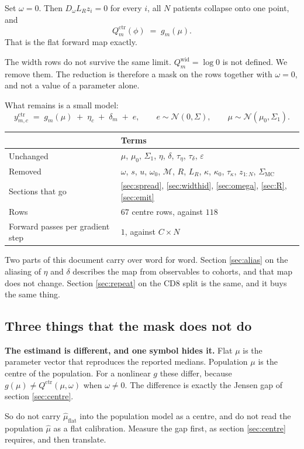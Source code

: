 \documentclass[11pt]{article}
\newcommand{\Ncal}{\mathcal{N}}
\newcommand{\Mset}{\mathcal{M}}
\newcommand{\ctr}{\mathrm{ctr}}
\newcommand{\wid}{\mathrm{wid}}
\begin{document}
Set $\omega=0$. Then $D_\omega L_R z_i = 0$ for every $i$, all $N$ patients
collapse onto one point, and
\begin{equation}
Q^\ctr_m(\phi) \;=\; g_m(\mu).
\end{equation}
That is the flat forward map exactly.

The width rows do not survive the same limit. $Q^\wid_m=\log 0$ is not defined.
We remove them. The reduction is therefore a mask on the rows together with
$\omega=0$, and not a value of a parameter alone.

What remains is a small model:
\begin{equation}
y^\ctr_{m,c} \;=\; g_m(\mu) \;+\; \eta_c \;+\; \delta_m \;+\; e,
\qquad e\sim\Ncal(0,\Sigma),
\qquad \mu\sim\Ncal(\mu_0,\Sigma_1).
\label{eq:flat}
\end{equation}

\begin{center}\small
\begin{tabularx}{\textwidth}{@{}lX@{}}
\toprule
 & Terms \\
\midrule
Unchanged & $\mu$, $\mu_0$, $\Sigma_1$, $\eta$, $\delta$, $\tau_\eta$,
             $\tau_\delta$, $\varepsilon$ \\
Removed & $\omega$, $s$, $u$, $\omega_0$, $\Mset$, $R$, $L_R$, $\kappa$,
          $\kappa_0$, $\tau_\kappa$, $z_{1:N}$, $\Sigma_{\text{MC}}$ \\
Sections that go & \ref{sec:spread}, \ref{sec:widthid}, \ref{sec:omega},
                   \ref{sec:R}, \ref{sec:emit} \\
Rows & $67$ centre rows, against $118$ \\
Forward passes per gradient step & $1$, against $C\times N$ \\
\bottomrule
\end{tabularx}
\end{center}

Two parts of this document carry over word for word. Section \ref{sec:alias} on
the aliasing of $\eta$ and $\delta$ describes the map from observables to
cohorts, and that map does not change. Section \ref{sec:repeat} on the CD8 split
is the same, and it buys the same thing.

\subsection{Three things that the mask does not do}

\begin{assumpbox}
\textbf{The estimand is different, and one symbol hides it.} Flat $\mu$ is the
parameter vector that reproduces the reported medians. Population $\mu$ is the
centre of the population. For a nonlinear $g$ these differ, because
$g(\mu)\neq Q^\ctr(\mu,\omega)$ when $\omega\neq 0$. The difference is exactly
the Jensen gap of section \ref{sec:centre}.

So do not carry $\hat\mu_{\text{flat}}$ into the population model as a centre,
and do not read the population $\hat\mu$ as a flat calibration. Measure the gap
first, as section \ref{sec:centre} requires, and then translate.
\end{assumpbox}
\end{document}
